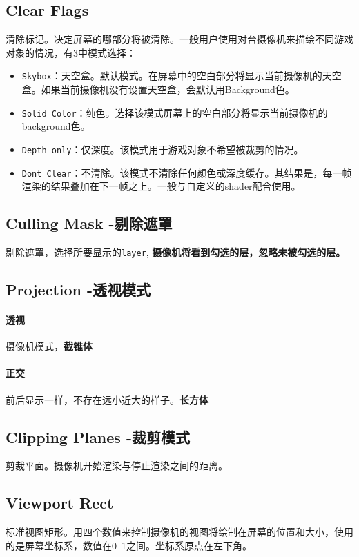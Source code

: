 \documentclass[UTF8,a4paper,12pt]{ctexbook}
\begin{document}
		\subsection{Clear Flags}
			清除标记。决定屏幕的哪部分将被清除。一般用户使用对台摄像机来描绘不同游戏对象的情况，有3中模式选择：
			\begin{itemize}
				\item \verb|Skybox|：天空盒。默认模式。在屏幕中的空白部分将显示当前摄像机的天空盒。如果当前摄像机没有设置天空盒，会默认用Background色。
				\item \verb|Solid Color|：纯色。选择该模式屏幕上的空白部分将显示当前摄像机的background色。
				\item \verb|Depth only|：仅深度。该模式用于游戏对象不希望被裁剪的情况。
				\item \verb|Dont Clear|：不清除。该模式不清除任何颜色或深度缓存。其结果是，每一帧渲染的结果叠加在下一帧之上。一般与自定义的shader配合使用。
			\end{itemize}
		\subsection{Culling Mask -剔除遮罩} 
			剔除遮罩，选择所要显示的\verb|layer|, \textbf{摄像机将看到勾选的层，忽略未被勾选的层。}
		
		\subsection{Projection -透视模式}
			\paragraph{透视}
				摄像机模式，\textbf{截锥体}
				
			\paragraph{正交}
				前后显示一样，不存在远小近大的样子。\textbf{长方体}
				
		\subsection{Clipping Planes -裁剪模式}
			剪裁平面。摄像机开始渲染与停止渲染之间的距离。
			
		\subsection{Viewport Rect}
			标准视图矩形。用四个数值来控制摄像机的视图将绘制在屏幕的位置和大小，使用的是屏幕坐标系，数值在0~1之间。坐标系原点在左下角。
			
\end{document}
